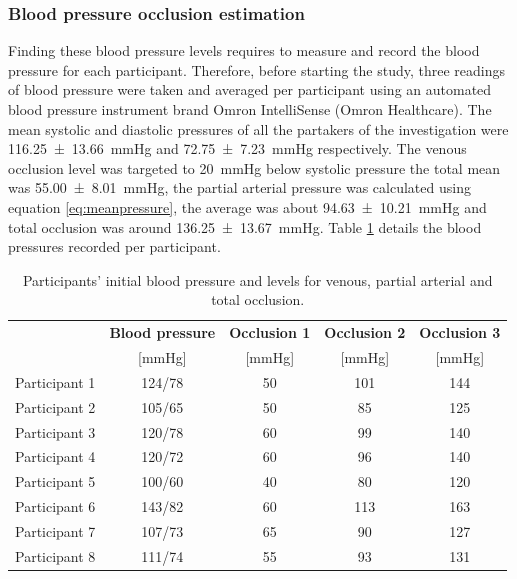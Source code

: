\subsubsection{Blood pressure occlusion estimation}
Finding these blood pressure levels requires to measure and record the blood pressure for each participant. Therefore, before starting the study, three readings of blood pressure were taken and averaged per participant using an automated blood pressure instrument brand Omron IntelliSense (Omron Healthcare). The mean systolic and diastolic pressures of all the partakers of the investigation were \SI{116.25(1366)}{\mmHg} and \SI{72.75(723)}{\mmHg} respectively. The venous occlusion level was targeted to \SI{20}{\mmHg} below systolic pressure the total mean was \SI{55.00(801)}{\mmHg}, the partial arterial pressure was calculated using equation \ref{eq:meanpressure}, the average was about \SI{94.63(1021)}{\mmHg} and total occlusion was around \SI{136.25(1367)}{\mmHg}. Table \ref{tbl: venous occlusions} details the blood pressures recorded per participant.

\begin{table}[!htbp] %
	\caption[Blood pressure and occlusion levels of the participants]{Participants' initial blood pressure and levels for venous, partial arterial and total occlusion.}
	\label{tbl: venous occlusions}
	\centering
	\begin{tabular}    {lcccc}
		\toprule
		& \textbf{Blood pressure}  &  \textbf{Occlusion 1}   & \textbf{Occlusion 2}  &  \textbf{Occlusion 3} \\
		&  [\si{\mmHg}]   &        [\si{\mmHg}]  &    [\si{\mmHg}]   &  [\si{\mmHg}]\\ \midrule
		Participant 1  &  124/78   &        50  &    101   &  144\\ 
		Participant 2  &  105/65   &        50  &     85   &  125 \\
		Participant 3  &  120/78   &        60  &     99   &  140 \\
		Participant 4  &  120/72   &        60  &     96   &  140 \\
		Participant 5  &  100/60   &        40  &     80   &  120 \\
		Participant 6  &  143/82   &        60  &    113   &  163 \\
		Participant 7  &  107/73   &        65  &     90   &  127 \\
		Participant 8  &  111/74   &        55  &     93   &  131 \\\bottomrule
	\end{tabular}
\end{table}

